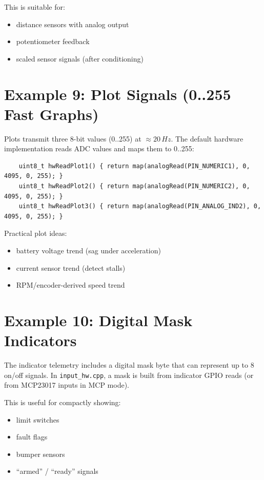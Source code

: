 This is suitable for:
\begin{itemize}
    \item distance sensors with analog output
    \item potentiometer feedback
    \item scaled sensor signals (after conditioning)
\end{itemize}

\section{Example 9: Plot Signals (0..255 Fast Graphs)}
\label{sec:example-plots}

Plots transmit three 8-bit values (0..255) at \(\approx 20\,Hz\). The default hardware implementation reads
ADC values and maps them to 0..255:

\begin{verbatim}
    uint8_t hwReadPlot1() { return map(analogRead(PIN_NUMERIC1), 0, 4095, 0, 255); }
    uint8_t hwReadPlot2() { return map(analogRead(PIN_NUMERIC2), 0, 4095, 0, 255); }
    uint8_t hwReadPlot3() { return map(analogRead(PIN_ANALOG_IND2), 0, 4095, 0, 255); }
\end{verbatim}

\noindent Practical plot ideas:
\begin{itemize}
    \item battery voltage trend (sag under acceleration)
    \item current sensor trend (detect stalls)
    \item RPM/encoder-derived speed trend
\end{itemize}

\section{Example 10: Digital Mask Indicators}
\label{sec:example-digital-mask}

The indicator telemetry includes a digital mask byte that can represent up to 8 on/off signals.
In \texttt{input\_hw.cpp}, a mask is built from indicator GPIO reads (or from MCP23017 inputs in MCP mode).

This is useful for compactly showing:
\begin{itemize}
    \item limit switches
    \item fault flags
    \item bumper sensors
    \item ``armed'' / ``ready'' signals
\end{itemize}

